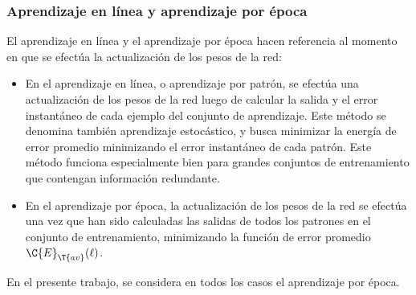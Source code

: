 \subsubsection{Aprendizaje en línea y aprendizaje por época}
%
El aprendizaje en línea y el aprendizaje por época hacen referencia
al momento en que se efectúa la actualización de los pesos de la
red:
%
\begin{itemize}
\item En el aprendizaje en línea, o aprendizaje por patrón, se efectúa una
  actualización de los pesos de la red luego de calcular la salida y el
  error instantáneo de cada ejemplo del conjunto de aprendizaje.  Este
  método se denomina también aprendizaje estocástico, y busca
  minimizar la energía de error promedio minimizando el error
  instantáneo de cada patrón.  Este método funciona especialmente bien
  para grandes conjuntos de entrenamiento que contengan información
  redundante.
\item En el aprendizaje por época, la actualización de los pesos de la red
  se efectúa una vez que han sido calculadas las salidas de todos los
  patrones en el conjunto de entrenamiento, minimizando la función de
  error promedio $\C{E}_{\T{av}}(\ell)$.
\end{itemize}
%
En el presente trabajo, se considera en todos los casos el aprendizaje
por época.





